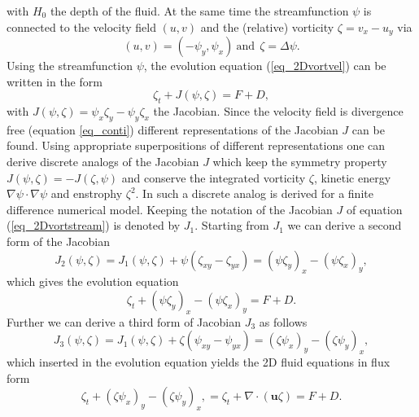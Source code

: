 with $H_{0}$ the depth of the fluid. At the same time
the streamfunction $\psi$ is connected to the velocity 
field $(u,v)$ and the (relative) 
vorticity $\zeta = v_{x} - u_{y}$ via
\begin{equation} \label{eq_psiuv}
  (u,v) = (- \psi_{y},\psi_{x}) \ \mbox{and} \ \ \zeta = \Delta \psi.
\end{equation}
Using the streamfunction $\psi$, the evolution equation (\ref{eq_2Dvortvel})
can be written in the form
\begin{equation} \label{eq_2Dvortstream}
  \zeta_{t} + J(\psi,\zeta) = F + D,
\end{equation}
with $J(\psi,\zeta) = \psi_{x} \zeta_{y} - \psi_{y} \zeta_{x}$ the Jacobian.
Since the velocity field is divergence free (equation \ref{eq_conti})
different representations of the Jacobian $J$ can be found. Using 
appropriate superpositions of different representations one can derive 
discrete analogs of the Jacobian $J$ which keep the symmetry 
property $J(\psi,\zeta) = -J(\zeta,\psi)$ and conserve the integrated 
vorticity $\zeta$, kinetic energy $\nabla \psi \cdot \nabla \psi $  and
enstrophy $\zeta^{2}$. In \cite{arakawa1966} such a discrete analog is 
derived for a finite difference numerical model. Keeping the notation of 
\cite{arakawa1966} the Jacobian $J$ of equation (\ref{eq_2Dvortstream}) 
is denoted by $J_{1}$. Starting from $J_{1}$ we can derive a second form 
of the Jacobian 
\begin{equation} \label{eq_Jacobi2} 
  J_{2}(\psi,\zeta) 
   = 
  J_{1}(\psi,\zeta) + \psi \left( \zeta_{xy} - \zeta_{yx} \right)
   = 
  \left(\psi  \zeta_{y} \right)_{x}
   - 
  \left(\psi  \zeta_{x} \right)_{y},
\end{equation}
which gives the evolution equation
\begin{equation} \label{eq_2DJacobi2} 
  \zeta_{t} + \left(\psi  \zeta_{y} \right)_{x}  
            - \left(\psi  \zeta_{x} \right)_{y} = F + D.
\end{equation}
Further we can derive a third form of Jacobian $J_{3}$ as follows 
\begin{equation} \label{eq_Jacobi3}
  J_{3}(\psi,\zeta) 
   = 
  J_{1}(\psi,\zeta) + \zeta \left( \psi_{xy} - \psi_{yx} \right)
   = 
  \left(\zeta  \psi_{x} \right)_{y}
   - 
  \left(\zeta  \psi_{y} \right)_{x},
\end{equation}
which inserted in the evolution equation yields the 2D fluid equations
in flux form
\begin{equation} \label{eq_2Dflux}
  \zeta_{t} + 
  \left(\zeta  \psi_{x} \right)_{y}
   - 
  \left(\zeta  \psi_{y} \right)_{x},
   = 
  \zeta_{t} + \nabla \cdot \left(\mathbf{u} \zeta \right) 
   = F + D.
\end{equation}

